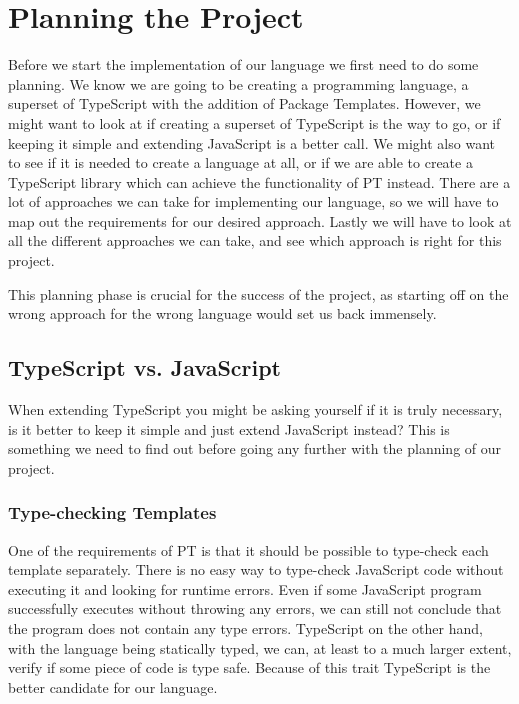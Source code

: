 
\chapter{Planning the Project}\label{ch:planning-the-project}

Before we start the implementation of our language we first need to do some planning.
We know we are going to be creating a programming language, a superset of TypeScript with the addition of Package Templates.
However, we might want to look at if creating a superset of TypeScript is the way to go, or if keeping it simple and extending JavaScript is a better call.
We might also want to see if it is needed to create a language at all, or if we are able to create a TypeScript library which can achieve the functionality of PT instead.
There are a lot of approaches we can take for implementing our language, so we will have to map out the requirements for our desired approach.
Lastly we will have to look at all the different approaches we can take, and see which approach is right for this project.

This planning phase is crucial for the success of the project, as starting off on the wrong approach for the wrong language would set us back immensely.

\section{TypeScript vs. JavaScript}\label{sec:typescript-vs-javascript}

When extending TypeScript you might be asking yourself if it is truly necessary, is it better to keep it simple and just extend JavaScript instead?
This is something we need to find out before going any further with the planning of our project.

\subsection{Type-checking Templates}\label{subsec:why-typescript-verifying-templates}

One of the requirements of PT is that it should be possible to type-check each template separately.
There is no easy way to type-check JavaScript code without executing it and looking for runtime errors.
Even if some JavaScript program successfully executes without throwing any errors, we can still not conclude that the program does not contain any type errors.
TypeScript on the other hand, with the language being statically typed, we can, at least to a much larger extent, verify if some piece of code is type safe.
Because of this trait TypeScript is the better candidate for our language.


